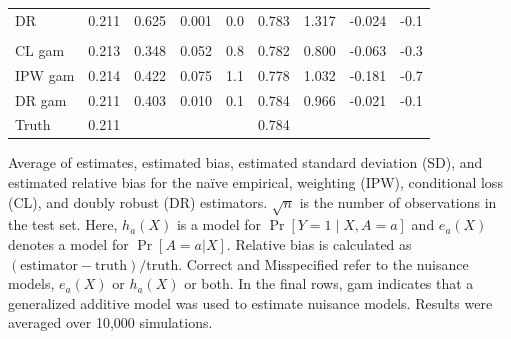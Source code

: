 \begin{table}[t]
\begin{threeparttable}
\begin{tabular}{lcccccccc}
    \hspace{1em}DR & 0.211 & 0.625 & 0.001 & 0.0 & 0.783 & 1.317 & -0.024 & -0.1\\
    \addlinespace[0.3em]
    \multicolumn{9}{l}{Both misspecified}\\
    \hspace{1em}CL gam & 0.213 & 0.348 & 0.052 & 0.8 & 0.782 & 0.800 & -0.063 & -0.3\\
    \hspace{1em}IPW gam & 0.214 & 0.422 & 0.075 & 1.1 & 0.778 & 1.032 & -0.181 & -0.7\\
    \hspace{1em}DR gam & 0.211 & 0.403 & 0.010 & 0.1 & 0.784 & 0.966 & -0.021 & -0.1\\
    Truth & 0.211 & &  &  & 0.784 & &  & \\
    \bottomrule
    \end{tabular}
    \begin{tablenotes}
    \item Average of estimates, estimated bias, estimated standard deviation (SD), and estimated relative bias for the na\"{i}ve empirical, weighting (IPW), conditional loss (CL), and doubly robust (DR) estimators. $\sqrt{n}$ is the number of observations in the test set. Here, $h_a(X)$ is a model for $\operatorname{Pr}[Y=1 \mid X, A=a]$ and $e_a(X)$ denotes a model for $\Pr[A = a|X]$. Relative bias is calculated as $(\text{estimator} -\text{truth})/\text{truth}$. Correct and Misspecified refer to the nuisance models, $e_a(X)$ or $h_a(X)$ or both. In the final rows, gam indicates that a generalized additive model was used to estimate nuisance models. Results were averaged over 10,000 simulations.
    \end{tablenotes}
    \end{threeparttable}
\end{table}

